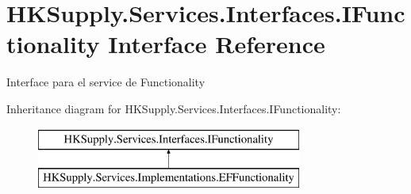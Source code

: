 \hypertarget{interface_h_k_supply_1_1_services_1_1_interfaces_1_1_i_functionality}{}\section{H\+K\+Supply.\+Services.\+Interfaces.\+I\+Functionality Interface Reference}
\label{interface_h_k_supply_1_1_services_1_1_interfaces_1_1_i_functionality}


Interface para el service de Functionality  


Inheritance diagram for H\+K\+Supply.\+Services.\+Interfaces.\+I\+Functionality\+:\begin{figure}[H]
\begin{center}
\leavevmode
\includegraphics[height=2.000000cm]{interface_h_k_supply_1_1_services_1_1_interfaces_1_1_i_functionality}
\end{center}
\end{figure}
